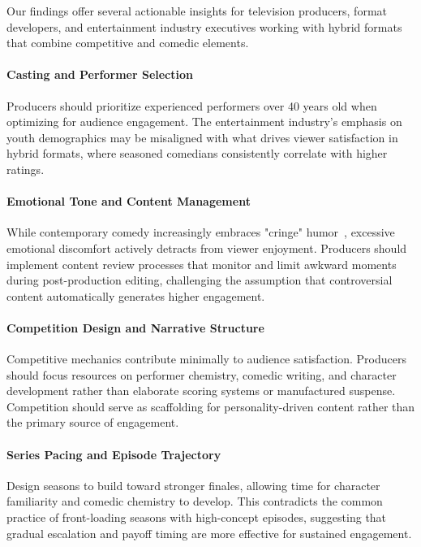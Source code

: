 \documentclass[10pt,letterpaper]{article}
\begin{document}
Our findings offer several actionable insights for television producers, format developers, and entertainment industry executives working with hybrid formats that combine competitive and comedic elements.

\paragraph{Casting and Performer Selection}
Producers should prioritize experienced performers over 40 years old when optimizing for audience engagement. The entertainment industry's emphasis on youth demographics may be misaligned with what drives viewer satisfaction in hybrid formats, where seasoned comedians consistently correlate with higher ratings.

\paragraph{Emotional Tone and Content Management}
While contemporary comedy increasingly embraces "cringe" humor~\cite{HyeKnudsen2018}, excessive emotional discomfort actively detracts from viewer enjoyment. Producers should implement content review processes that monitor and limit awkward moments during post-production editing, challenging the assumption that controversial content automatically generates higher engagement.

\paragraph{Competition Design and Narrative Structure}
Competitive mechanics contribute minimally to audience satisfaction. Producers should focus resources on performer chemistry, comedic writing, and character development rather than elaborate scoring systems or manufactured suspense. Competition should serve as scaffolding for personality-driven content rather than the primary source of engagement.

\paragraph{Series Pacing and Episode Trajectory}
Design seasons to build toward stronger finales, allowing time for character familiarity and comedic chemistry to develop. This contradicts the common practice of front-loading seasons with high-concept episodes, suggesting that gradual escalation and payoff timing are more effective for sustained engagement.
\end{document}
